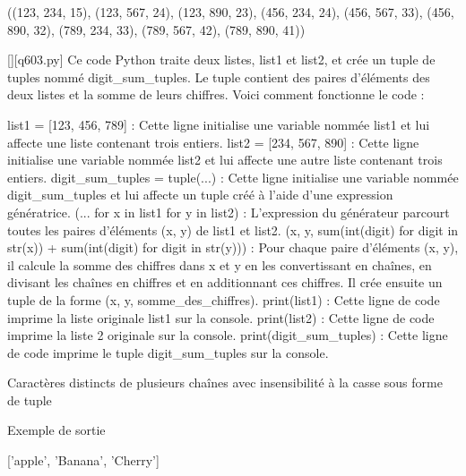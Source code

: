 ((123, 234, 15), (123, 567, 24), (123, 890, 23), (456, 234, 24), (456, 567, 33), (456, 890, 32), (789, 234, 33), (789, 567, 42), (789, 890, 41))
        \par
        \begin{solution}
            \renewcommand{\nomfichier}{q603.py}
            \pythonfile{\chemincode \nomfichier}[][\nomfichier]
            Ce code Python traite deux listes, list1 et list2, et crée un tuple de tuples nommé digit_sum_tuples. Le tuple contient des paires d'éléments des deux listes et la somme de leurs chiffres. Voici comment fonctionne le code :

    list1 = [123, 456, 789] : Cette ligne initialise une variable nommée list1 et lui affecte une liste contenant trois entiers.
    list2 = [234, 567, 890] : Cette ligne initialise une variable nommée list2 et lui affecte une autre liste contenant trois entiers.
    digit_sum_tuples = tuple(...) : Cette ligne initialise une variable nommée digit_sum_tuples et lui affecte un tuple créé à l'aide d'une expression génératrice.
        (... for x in list1 for y in list2) : L'expression du générateur parcourt toutes les paires d'éléments (x, y) de list1 et list2.
        (x, y, sum(int(digit) for digit in str(x)) + sum(int(digit) for digit in str(y))) : Pour chaque paire d'éléments (x, y), il calcule la somme des chiffres dans x et y en les convertissant en chaînes, en divisant les chaînes en chiffres et en additionnant ces chiffres. Il crée ensuite un tuple de la forme (x, y, somme_des_chiffres).
    print(list1) : Cette ligne de code imprime la liste originale list1 sur la console.
    print(list2) : Cette ligne de code imprime la liste 2 originale sur la console.
    print(digit_sum_tuples) : Cette ligne de code imprime le tuple digit_sum_tuples sur la console.
        \end{solution}
        

        \question
        Caractères distincts de plusieurs chaînes avec insensibilité à la casse sous forme de tuple

Exemple de sortie

['apple', 'Banana', 'Cherry']

